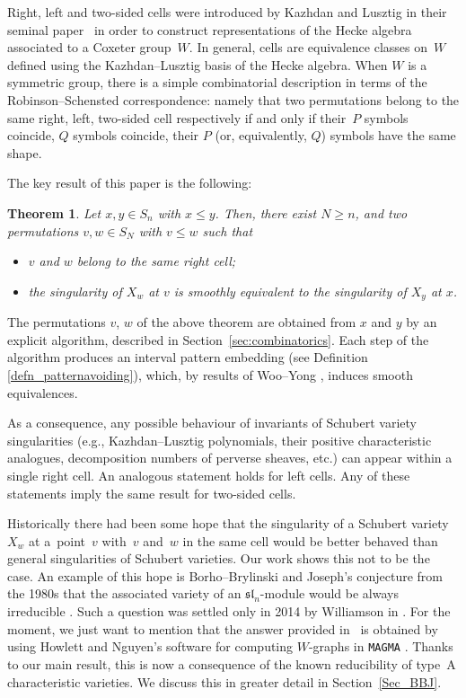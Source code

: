\documentclass[pdftex]{sigma}
\numberwithin{equation}{section}
\newtheorem{Theorem}{Theorem}[section]
\begin{document}
Right, left and two-sided cells were introduced by Kazhdan and Lusztig in their seminal paper~\cite{KL79} in order to construct representations of the Hecke algebra associated to a Coxeter group~$W$. In general, cells are equivalence classes on~$W$ defined using the Kazhdan--Lusztig basis of the Hecke algebra. When $W$ is a symmetric group, there is a simple combinatorial description in terms of the Robinson--Schensted correspondence: namely that two permutations belong to the same right, left, two-sided cell respectively if and only if their~$P$ symbols coincide, $Q$ symbols coincide, their $P$ (or, equivalently, $Q$) symbols have the same shape.

The key result of this paper is the following:
\begin{Theorem}\label{Thm_Main}Let $x,y\in S_n$ with $x\leq y$. Then, there exist $N\geq n$, and two permutations $v,w\in S_N$ with $v\leq w$ such that
\begin{itemize}\itemsep=0pt
\item $v$ and $w$ belong to the same right cell;
\item the singularity of $X_w$ at $v$ is smoothly equivalent to the singularity of $X_y$ at $x$.
\end{itemize}
\end{Theorem}
The permutations $v$, $w$ of the above theorem are obtained from $x$ and $y$ by an explicit algorithm, described in Section~\ref{sec:combinatorics}. Each step of the algorithm produces an interval pattern embedding (see Definition \ref{defn_patternavoiding}), which, by results of Woo--Yong \cite{wooyong}, induces smooth equivalences.

As a consequence, any possible behaviour of invariants of Schubert variety singularities (e.g., Kazhdan--Lusztig polynomials, their positive characteristic analogues, decomposition numbers of perverse sheaves, etc.) can appear within a single right cell. An analogous statement holds for left cells. Any of these statements imply the same result for two-sided cells.

Historically there had been some hope that the singularity of a Schubert variety $X_w$ at a~point~$v$ with~$v$ and~$w$ in the same cell would be better behaved than general singularities of Schubert varieties. Our work shows this not to be the case. An example of this hope is Borho--Brylinski and Joseph's conjecture from the 1980s that the associated variety of an $\mathfrak{sl}_n$-module would be always irreducible \cite{BB,J}. Such a question was settled only in 2014 by Williamson in \cite{williamson}. For the moment, we just want to mention that the answer provided in~\cite{williamson} is obtained by using Howlett and Nguyen's software \cite{HN} for computing $W$-graphs in {\tt MAGMA} \cite{BCP}. Thanks to our main result, this is now a consequence of the known reducibility of type~A characteristic varieties. We discuss this in greater detail in Section~\ref{Sec_BBJ}.
\end{document}
